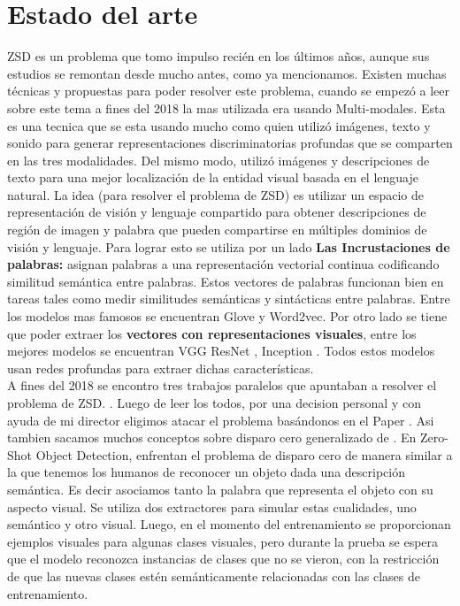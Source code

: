\section{Estado del arte}
ZSD es un problema que tomo impulso recién en los últimos años, aunque sus estudios se remontan desde mucho antes, como ya mencionamos. Existen muchas técnicas y propuestas para poder resolver este problema, cuando se empezó a leer sobre este tema a fines del 2018 la mas utilizada era usando Multi-modales. Esta es una tecnica que se esta usando mucho como \cite{aytar2017see} quien utilizó imágenes, texto y sonido para generar representaciones discriminatorias profundas que se comparten en las tres modalidades. Del mismo modo, \cite{zhang2017discriminative} utilizó imágenes y descripciones de texto para una mejor localización de la entidad visual basada en el lenguaje natural. La idea (para resolver el problema de ZSD) es utilizar un espacio de representación de visión y lenguaje compartido para obtener descripciones de región de imagen y palabra que pueden compartirse en múltiples dominios de visión y lenguaje.	Para lograr esto se utiliza por un lado \textbf{Las Incrustaciones de palabras:} asignan palabras a una representación vectorial continua codificando similitud semántica entre palabras. Estos vectores de palabras funcionan bien en tareas tales como medir similitudes semánticas y sintácticas entre palabras. Entre los modelos mas famosos se encuentran Glove\cite{pennington-etal-2014-glove} y Word2vec\cite{mikolov2013efficient}. Por otro lado se tiene que poder extraer los \textbf{vectores con representaciones visuales}, entre los mejores modelos se encuentran VGG \cite{simonyan2014very} ResNet \cite{resnet}, Inception \cite{Szegedy_2015_CVPR}. Todos estos modelos usan redes profundas para extraer dichas características.\\
A fines del 2018 se encontro tres trabajos paralelos que apuntaban a resolver el problema de ZSD. \cite{rahman2018zero} \cite{zhu2018zero} \cite{bansal2018zero}. Luego de leer los todos, por una decision personal y con ayuda de mi director eligimos atacar el problema basándonos en el Paper \cite{bansal2018zero}. Asi tambien sacamos muchos conceptos sobre disparo cero generalizado de \cite{zero-shot-generalizado}. En Zero-Shot Object Detection\cite{bansal2018zero}, enfrentan el problema de disparo cero de manera similar a la que tenemos los humanos de reconocer un objeto dada una descripción semántica. Es decir asociamos tanto la palabra que representa el objeto con su aspecto visual. Se utiliza dos extractores para simular estas cualidades, uno semántico y otro visual. Luego, en el momento del entrenamiento se proporcionan ejemplos visuales para algunas clases visuales, pero durante la prueba se espera que el modelo reconozca instancias de clases que no se vieron, con la restricción de que las nuevas clases estén semánticamente relacionadas con las clases de entrenamiento.
